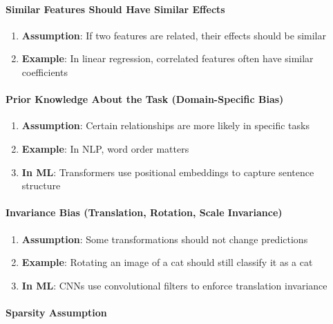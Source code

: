 \paragraph{Similar Features Should Have Similar Effects}
\label{para:similar-features}

\begin{enumerate}
\item \textbf{Assumption}: If two features are related, their effects should be similar
\item \textbf{Example}: In linear regression, correlated features often have similar coefficients
\end{enumerate}

\paragraph{Prior Knowledge About the Task (Domain-Specific Bias)}
\label{para:domain-specific-bias}

\begin{enumerate}
\item \textbf{Assumption}: Certain relationships are more likely in specific tasks
\item \textbf{Example}: In NLP, word order matters
\item \textbf{In ML}: Transformers use positional embeddings to capture sentence structure
\end{enumerate}

\paragraph{Invariance Bias (Translation, Rotation, Scale Invariance)}
\label{para:invariance-bias}

\begin{enumerate}
\item \textbf{Assumption}: Some transformations should not change predictions
\item \textbf{Example}: Rotating an image of a cat should still classify it as a cat
\item \textbf{In ML}: CNNs use convolutional filters to enforce translation invariance
\end{enumerate}

\paragraph{Sparsity Assumption}
\label{para:sparsity-assumption}

